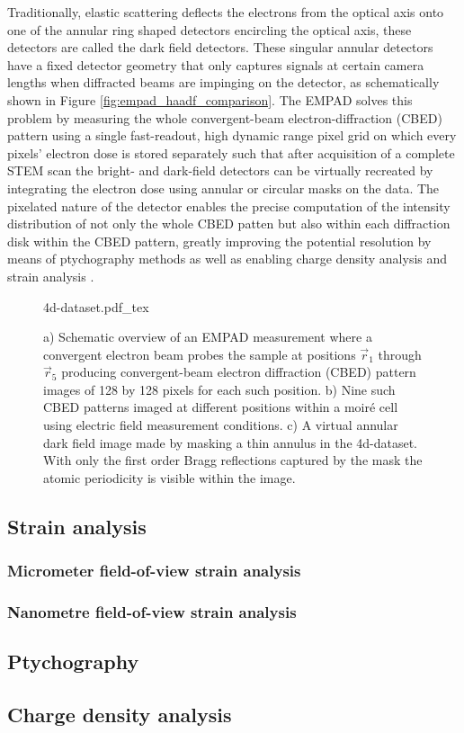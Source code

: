 Traditionally, elastic scattering deflects the electrons from the optical axis onto one of the annular ring shaped detectors encircling the optical axis, these detectors are called the dark field detectors. These singular annular detectors have a fixed detector geometry that only captures signals at certain camera lengths when diffracted beams are impinging on the detector, as schematically shown in Figure \ref{fig:empad_haadf_comparison}. The EMPAD solves this problem by measuring the whole convergent-beam electron-diffraction (CBED) pattern using a single fast-readout, high dynamic range pixel grid on which every pixels' electron dose is stored separately such that after acquisition of a complete STEM scan the bright- and dark-field detectors can be virtually recreated by integrating the electron dose using annular or circular masks on the data.
The pixelated nature of the detector enables the precise computation of the intensity distribution of not only the whole CBED patten but also within each diffraction disk within the CBED pattern, greatly improving the potential resolution by means of ptychography methods \cite{pennycookEfficientPhaseContrast2015, yangEfficientPhaseContrast2015a} as well as enabling charge density analysis \cite{hachtelSubAngstromElectricField2018,wenMapping1DConfined2022,fangAtomicElectrostaticMaps2019} and strain analysis \cite{hanStrainMappingTwoDimensional2018, ophusFourDimensionalScanningTransmission2019}.

\begin{figure}[h]
	\centering
	\def\svgwidth{1\linewidth}
	{4d-dataset.pdf_tex}
    \caption{a) Schematic overview of an EMPAD measurement where a convergent electron beam probes the sample at positions $\vec{r}_1$ through $\vec{r}_5$ producing convergent-beam electron diffraction (CBED) pattern images of 128 by 128 pixels for each such position. b) Nine such CBED patterns imaged at different positions within a moiré cell using electric field measurement conditions. c) A virtual annular dark field image made by masking a thin annulus in the 4d-dataset. With only the first order Bragg reflections captured by the mask the atomic periodicity is visible within the image.}
	\label{fig:4d_dataset}
\end{figure}

\subsection{Strain analysis}
\subsubsection{Micrometer field-of-view strain analysis}
\subsubsection{Nanometre field-of-view strain analysis}

\subsection{Ptychography}

\subsection{Charge density analysis}
